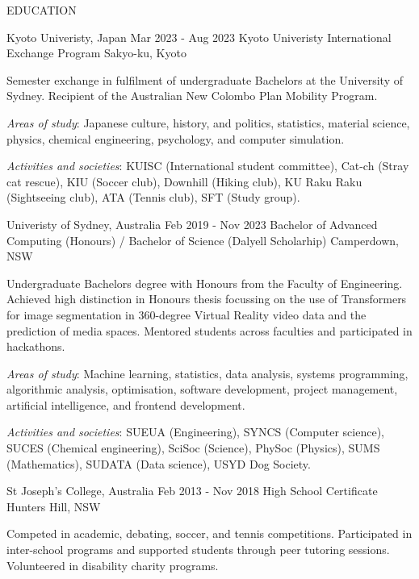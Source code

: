 
\begin{ResumeSection}{EDUCATION}

    \begin{DatedField}
        {Kyoto Univeristy, Japan}
        {Mar 2023 - Aug 2023}
        {Kyoto Univeristy International Exchange Program}
        {Sakyo-ku, Kyoto}
        \item Semester exchange in fulfilment of undergraduate Bachelors at the University of Sydney. Recipient of the Australian New Colombo Plan Mobility Program.
        \item \textit{Areas of study}: Japanese culture, history, and politics, statistics, material science, physics, chemical engineering, psychology, and computer simulation.
        \item \textit{Activities and societies}: KUISC (International student committee), Cat-ch (Stray cat rescue), KIU (Soccer club), Downhill (Hiking club), KU Raku Raku (Sightseeing club), ATA (Tennis club), SFT (Study group).
    \end{DatedField}

    \begin{DatedField}
        {Univeristy of Sydney, Australia}
        {Feb 2019 - Nov 2023}
        {Bachelor of Advanced Computing (Honours) / Bachelor of Science (Dalyell Scholarhip)}
        {Camperdown, NSW}
        \item Undergraduate Bachelors degree with Honours from the Faculty of Engineering. Achieved high distinction in Honours thesis focussing on the use of Transformers for image segmentation in 360-degree Virtual Reality video data and the prediction of media spaces. Mentored students across faculties and participated in hackathons.
        \item \textit{Areas of study}: Machine learning, statistics, data analysis, systems programming, algorithmic analysis, optimisation, software development, project management, artificial intelligence, and frontend development.
        \item \textit{Activities and societies}: SUEUA (Engineering), SYNCS (Computer science), SUCES (Chemical engineering), SciSoc (Science), PhySoc (Physics), SUMS (Mathematics), SUDATA (Data science), USYD Dog Society.
    \end{DatedField}

    \begin{DatedField}
        {St Joseph's College, Australia}
        {Feb 2013 - Nov 2018}
        {High School Certificate}
        {Hunters Hill, NSW}
        \item Competed in academic, debating, soccer, and tennis competitions. Participated in inter-school programs and supported students through peer tutoring sessions. Volunteered in disability charity programs.
    \end{DatedField}
    
\end{ResumeSection}